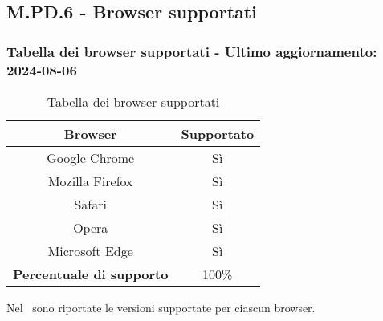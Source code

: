 \subsection{M.PD.6 - Browser supportati}

\subsubsection*{Tabella dei browser supportati - Ultimo aggiornamento: 2024-08-06}

\begin{table}[H]
  \centering
  \begin{tabular}{|c|c|}
      \hline
      \textbf{Browser} & \textbf{Supportato} \\
      \hline
      Google Chrome & Sì \\
      \hline
      Mozilla Firefox & Sì \\
      \hline
      Safari & Sì \\
      \hline
      Opera & Sì \\
      \hline
      Microsoft Edge & Sì \\
      \hline
      \textbf{Percentuale di supporto} & 100\% \\
      \hline 
  \end{tabular}
  \caption{Tabella dei browser supportati}
\end{table}

\par Nel \MU\ sono riportate le versioni supportate per ciascun browser.